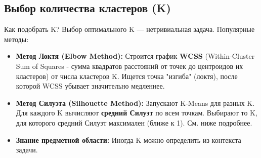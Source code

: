 \subsection{Выбор количества кластеров (K)}
\begin{myexampleblock}{Как подобрать K?}
    Выбор оптимального K — нетривиальная задача. Популярные методы:
    \begin{itemize}
        \item \textbf{Метод Локтя (Elbow Method):} Строится график \textbf{WCSS} (Within-Cluster Sum of Squares - сумма квадратов расстояний от точек до центроидов их кластеров) от числа кластеров K. Ищется точка "изгиба" (локтя), после которой WCSS убывает значительно медленнее.
        \item \textbf{Метод Силуэта (Silhouette Method):} Запускают K-Means для разных K. Для каждого K вычисляют \textbf{средний Силуэт} по всем точкам. Выбирают то K, для которого средний Силуэт максимален (ближе к 1). См. ниже подробнее.
        \item \textbf{Знание предметной области:} Иногда K можно определить из контекста задачи.
    \end{itemize}
    \begin{center}
    \end{center}
\end{myexampleblock}

